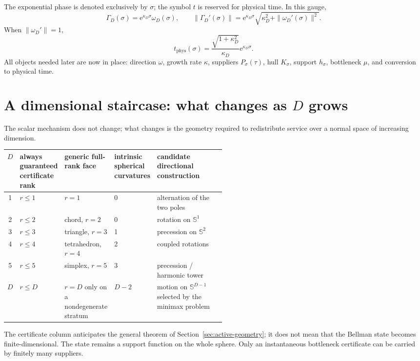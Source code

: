 \documentclass[10pt,a4paper]{article}
\newcommand{\Sph}{\mathbb{S}}
\newcommand{\e}{\mathrm{e}}
\newcommand{\tphys}{t_{\mathrm{phys}}}
\theoremstyle{plain}
\theoremstyle{definition}
\theoremstyle{remark}
\begin{document}
The exponential phase is denoted exclusively by $\sigma$; the symbol $t$ is reserved for physical time. In this gauge,
\[
  \Gamma_D(\sigma)=\e^{\kappa_D\sigma}\omega_D(\sigma),
  \qquad
  \|\Gamma_D'(\sigma)\|
  =\e^{\kappa_D\sigma}
   \sqrt{\kappa_D^2+\|\omega_D'(\sigma)\|^2}.
\]
When $\|\omega_D'\|=1$,
\[
  \tphys(\sigma)=\frac{\sqrt{1+\kappa_D^2}}{\kappa_D}\e^{\kappa_D\sigma}.
\]
All objects needed later are now in place: direction $\omega$, growth rate $\kappa$, suppliers $P_\sigma(\tau)$, hull $K_\sigma$, support $h_\sigma$, bottleneck $\mu$, and conversion to physical time.

\section{A dimensional staircase: what changes as $D$ grows}

The scalar mechanism does not change; what changes is the geometry required to redistribute service over a normal space of increasing dimension.

\begin{center}
\small
\begin{tabularx}{\linewidth}{@{}c p{0.17\linewidth} p{0.20\linewidth} p{0.15\linewidth} X@{}}
\toprule
$D$ & always guaranteed certificate rank & generic full-rank face & intrinsic spherical curvatures & candidate directional construction\\
\midrule
1 & $r\le1$ & $r=1$ & 0 & alternation of the two poles\\
2 & $r\le2$ & chord, $r=2$ & 0 & rotation on $\Sph^1$\\
3 & $r\le3$ & triangle, $r=3$ & 1 & precession on $\Sph^2$\\
4 & $r\le4$ & tetrahedron, $r=4$ & 2 & coupled rotations\\
5 & $r\le5$ & simplex, $r=5$ & 3 & precession / harmonic tower\\
$D$ & $r\le D$ & $r=D$ only on a nondegenerate stratum & $D-2$ & motion on $\Sph^{D-1}$ selected by the minimax problem\\
\bottomrule
\end{tabularx}
\end{center}

The certificate column anticipates the general theorem of Section~\ref{sec:active-geometry}; it does not mean that the Bellman state becomes finite-dimensional. The state remains a support function on the whole sphere. Only an instantaneous bottleneck certificate can be carried by finitely many suppliers.
\end{document}
